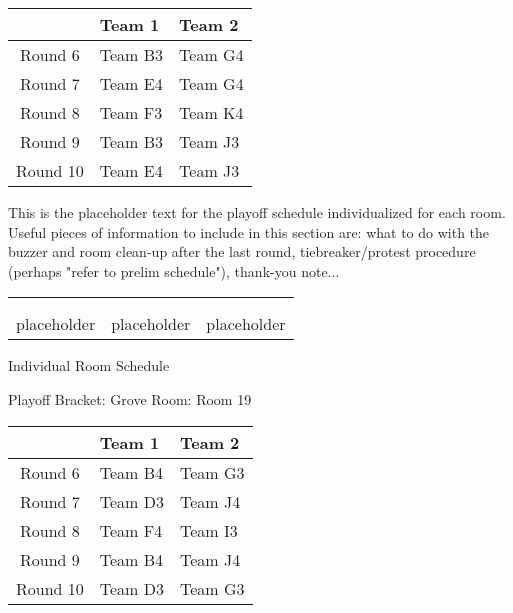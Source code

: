 \documentclass{article}%
\begin{document}
%
\begin{tabularx}{\textwidth}{|c|Y|Y|}%
\hline%
&Team 1&Team 2\\%
\hline%
Round 6&Team B3&Team G4\\%
Round 7&Team E4&Team G4\\%
Round 8&Team F3&Team K4\\%
Round 9&Team B3&Team J3\\%
Round 10&Team E4&Team J3\\%
\hline%
\end{tabularx}%
\vspace*{16pt}%
\linebreak%
This is the placeholder text for the playoff schedule individualized for each room. Useful pieces of information to include in this section are: what to do with the buzzer and room clean{-}up after the last round, tiebreaker/protest procedure (perhaps "refer to prelim schedule"), thank{-}you note...%
\vspace*{30pt}%
\newline%
%
\begin{tabularx}{\textwidth}{YYY}%
  &  &  \\%
\\%
placeholder&placeholder&placeholder\\%
\end{tabularx}%
\newpage%
\begin{center}%
\begin{Huge}%
Individual Room Schedule%
\end{Huge}%
\vspace*{16pt}%
\linebreak%
\begin{Large}%
Playoff Bracket: Grove \hfill Room: Room 19%
\end{Large}%
\end{center}%
%
\begin{tabularx}{\textwidth}{|c|Y|Y|}%
\hline%
&Team 1&Team 2\\%
\hline%
Round 6&Team B4&Team G3\\%
Round 7&Team D3&Team J4\\%
Round 8&Team F4&Team I3\\%
Round 9&Team B4&Team J4\\%
Round 10&Team D3&Team G3\\%
\hline%
\end{tabularx}%
\end{document}
